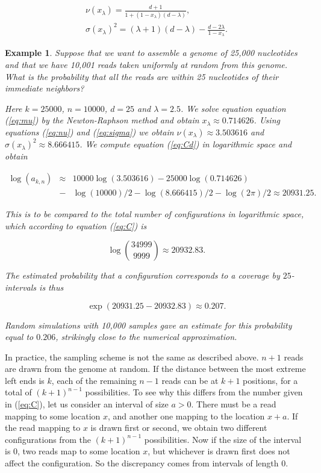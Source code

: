\documentclass{article}
\newtheorem{example}{Example}
\begin{document}
\begin{gather}
\nu(x_\lambda) = \frac{d+1}{1 +
  (1-x_\lambda)(d-\lambda)}, \label{eq:nu} \\
\sigma(x_\lambda)^2 = (\lambda+1)(d-\lambda) -
  \frac{d-2\lambda}{1-x_\lambda}. \label{eq:sigma}
\end{gather}


\begin{example}

Suppose that we want to assemble a genome of 25,000 nucleotides and that
we have 10,001 reads taken uniformly at random from this genome. What is
the probability that all the reads are within 25 nucleotides of their
immediate neighbors?

Here $k=25000$, $n=10000$, $d=25$ and $\lambda = 2.5$. We solve equation
equation (\ref{eq:mu}) by the Newton-Raphson method and obtain $x_\lambda
\approx 0.714626$. Using equations (\ref{eq:nu}) and (\ref{eq:sigma}) we
obtain $\nu(x_\lambda) \approx 3.503616$ and $\sigma(x_\lambda)^2 \approx
8.666415$. We compute equation (\ref{eq:Cd}) in logarithmic space and
obtain

\begin{eqnarray*}
\log(a_{k,n}) &\approx& 10000 \log(3.503616) - 25000 \log(0.714626) \\
&-& \log(10000)/2 - \log(8.666415)/2 - \log(2\pi)/2
\approx 20931.25.
\end{eqnarray*}

This is to be compared to the total number of configurations in
logarithmic space, which according to equation (\ref{eq:C}) is

\begin{equation*}
\log { 34999 \choose 9999 } \approx 20932.83.
\end{equation*}

The estimated probability that a configuration corresponds to a coverage
by $25$-intervals is
thus

\begin{equation*}
\exp(20931.25-20932.83) \approx 0.207.
\end{equation*}

Random simulations with 10,000 samples gave an estimate for this
probability equal to $0.206$, strikingly close to the numerical
approximation.

\end{example}

In practice, the sampling scheme is not the same as described above.
$n+1$ reads are drawn from the genome at random. If the distance between
the most extreme left ends is $k$, each of the remaining $n-1$ reads can
be at $k+1$ positions, for a total of $(k+1)^{n-1}$ possibilities. To see
why this differs from the number given in (\ref{eq:C}), let us consider an
interval of size $a > 0$. There must be a read mapping to some location
$x$, and another one mapping to the location $x+a$. If the read mapping to
$x$ is drawn first or second, we obtain two different configurations from
the $(k+1)^{n-1}$ possibilities. Now if the size of the interval is 0, two
reads map to some location $x$, but whichever is drawn first does not
affect the configuration. So the discrepancy comes from intervals of
length 0.
\end{document}
